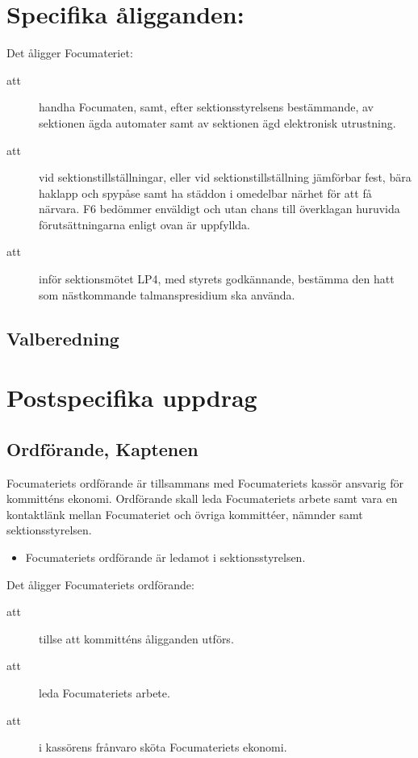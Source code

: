 \documentclass[a4paper]{article}
\begin{document}
\begin{foreningenv}{\forening{}}
    \section{Specifika åligganden:}
    Det åligger Focumateriet:
    \begin{description}
        \item[att] handha Focumaten, samt, efter sektionsstyrelsens bestämmande, av sektionen ägda automater samt av sektionen ägd elektronisk utrustning.
        \item[att] vid sektionstillställningar, eller vid sektionstillställning jämförbar fest, bära haklapp och spypåse samt ha städdon i omedelbar närhet för att få närvara. F6 bedömmer enväldigt och utan chans till överklagan huruvida förutsättningarna enligt ovan är uppfyllda.
        \item[att] inför sektionsmötet LP4, med styrets godkännande, bestämma den hatt som nästkommande talmanspresidium ska använda.
    \end{description}
    
    \subsection{Valberedning}
    \aliggvalber{}
    
    \section{Postspecifika uppdrag}
    \subsection{Ordförande, Kaptenen}
    Focumateriets ordförande är tillsammans med Focumateriets kassör ansvarig för kommitténs ekonomi. Ordförande skall leda Focumateriets arbete samt vara en kontaktlänk mellan Focumateriet och övriga kommittéer, nämnder samt sektionsstyrelsen. 
    
    \begin{itemize}
        \item Focumateriets ordförande är ledamot i sektionsstyrelsen.
    \end{itemize}
    
    Det åligger Focumateriets ordförande:
    \begin{description}
        \item[att] tillse att kommitténs åligganden utförs.
        \item[att] leda Focumateriets arbete. 
        \item[att] i kassörens frånvaro sköta Focumateriets ekonomi. 
    \end{description}
    

\end{foreningenv}
\end{document}
